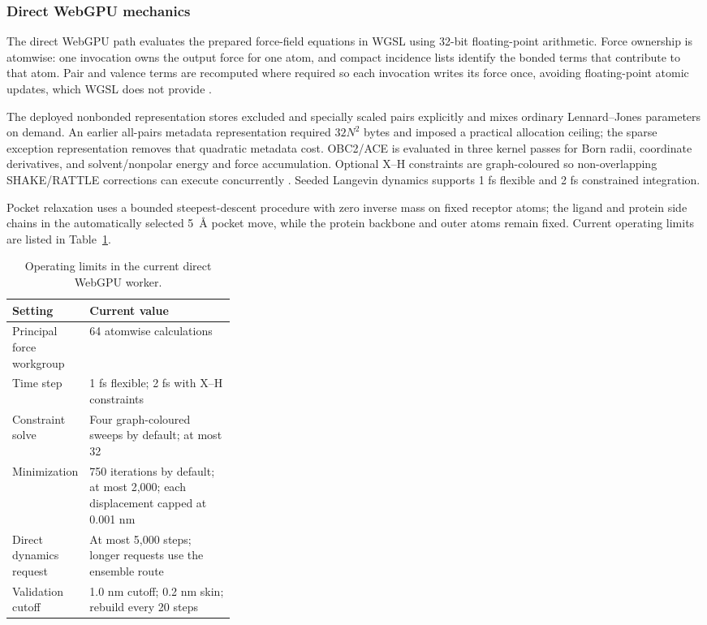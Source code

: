 \documentclass[11pt]{article}
\begin{document}
\begin{small}
\subsubsection{Direct WebGPU mechanics}

The direct WebGPU path evaluates the prepared force-field equations in WGSL using 32-bit floating-point arithmetic. Force ownership is atomwise: one invocation owns the output force for one atom, and compact incidence lists identify the bonded terms that contribute to that atom. Pair and valence terms are recomputed where required so each invocation writes its force once, avoiding floating-point atomic updates, which WGSL does not provide \citep{webgpuWGSL2026}.

The deployed nonbonded representation stores excluded and specially scaled pairs explicitly and mixes ordinary Lennard--Jones parameters on demand. An earlier all-pairs metadata representation required $32N^2$ bytes and imposed a practical allocation ceiling; the sparse exception representation removes that quadratic metadata cost. OBC2/ACE is evaluated in three kernel passes for Born radii, coordinate derivatives, and solvent/nonpolar energy and force accumulation. Optional X--H constraints are graph-coloured so non-overlapping SHAKE/RATTLE corrections can execute concurrently \citep{ryckaert1977shake,andersen1983rattle}. Seeded Langevin dynamics supports 1 fs flexible and 2 fs constrained integration.

Pocket relaxation uses a bounded steepest-descent procedure with zero inverse mass on fixed receptor atoms; the ligand and protein side chains in the automatically selected 5~\AA{} pocket move, while the protein backbone and outer atoms remain fixed. Current operating limits are listed in Table~\ref{tab:appA_webgpu_limits}.

\begin{table}[htbp]
\centering\small
\caption{Operating limits in the current direct WebGPU worker.}
\label{tab:appA_webgpu_limits}
\begin{tabularx}{0.95\linewidth}{@{}p{0.32\linewidth}X@{}}
\toprule
\textbf{Setting} & \textbf{Current value}\\
\midrule
Principal force workgroup & 64 atomwise calculations\\
Time step & 1 fs flexible; 2 fs with X--H constraints\\
Constraint solve & Four graph-coloured sweeps by default; at most 32\\
Minimization & 750 iterations by default; at most 2,000; each displacement capped at 0.001 nm\\
Direct dynamics request & At most 5,000 steps; longer requests use the ensemble route\\
Validation cutoff & 1.0 nm cutoff; 0.2 nm skin; rebuild every 20 steps\\
\bottomrule
\end{tabularx}
\end{table}


\end{small}
\end{document}

